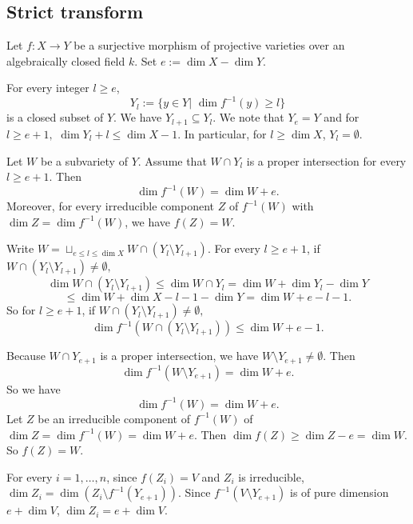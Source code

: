 \subsection{Strict transform}
Let $f:X\to Y$ be a surjective morphism of projective varieties over an algebraically closed field $k.$
Set $e:=\dim X-\dim Y$.

For every integer $l\geq e$,
$$Y_l:=\{y\in Y|\,\, \dim f^{-1}(y)\geq l\}$$
is a closed subset of $Y$.
We have $Y_{l+1}\subseteq Y_l$.
We note that $Y_{e}=Y$ and for $l\geq e+1,$
$\dim Y_l+l\leq \dim X-1$. In particular, for $l\geq \dim X$, $Y_l=\emptyset.$


\begin{lem}
\notready\label{lempullbackproper}
Let $W$ be a subvariety of $Y$.
Assume that $W\cap Y_l$ is a proper intersection for every $l\geq e+1$.
Then
$$\dim f^{-1}(W)=\dim W+e.$$
Moreover, for every irreducible component $Z$ of $f^{-1}(W)$ with $\dim Z=\dim f^{-1}(W)$, we have $f(Z)=W.$
\end{lem}

\proof
Write $W=\sqcup_{e\leq l\leq \dim X} W\cap(Y_l\setminus Y_{l+1}).$
For every $l\geq e+1$, if $W\cap(Y_l\setminus Y_{l+1})\neq \emptyset,$
$$\dim W\cap(Y_l\setminus Y_{l+1})\leq \dim W\cap Y_l=\dim W+\dim Y_l-\dim Y$$
$$\leq \dim W+\dim X-l-1-\dim Y=\dim W+e-l-1.$$
So for $l\geq e+1$, if $W\cap(Y_l\setminus Y_{l+1})\neq \emptyset,$
$$\dim f^{-1}(W\cap (Y_l\setminus Y_{l+1}))\leq \dim W+e-1.$$




Because $W\cap Y_{e+1}$ is a proper intersection, we have $W\setminus Y_{e+1}\neq \emptyset.$
Then $$\dim f^{-1}(W\setminus Y_{e+1})=\dim W+e.$$
So we have $$\dim f^{-1}(W)=\dim W+e.$$
Let $Z$ be an irreducible component of $f^{-1}(W)$ of $\dim Z=\dim f^{-1}(W)=\dim W+e$.
Then $\dim f(Z)\geq \dim Z-e= \dim W.$ So $f(Z)=W.$
%
\endproof



For every $i=1,\dots,n$, since $f(Z_i)=V$ and $Z_i$ is irreducible,
$\dim Z_i=\dim (Z_i\setminus f^{-1}(Y_{e+1})).$
Since $f^{-1}(V\setminus Y_{e+1})$ is of pure dimension $e+\dim V$,  $\dim Z_i=e+\dim V.$

